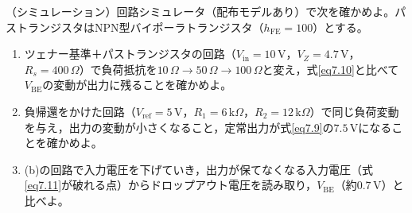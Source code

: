 \begin{章末問題}
\item \label{ex7.6}（シミュレーション）回路シミュレータ（配布モデルあり）で次を確かめよ。パストランジスタはNPN型バイポーラトランジスタ（$h_{\mathrm{FE}} = 100$）とする。
\begin{enumerate}
\item[(a)] ツェナー基準＋パストランジスタの回路（$V_{\mathrm{in}} = 10$\,V，$V_Z = 4.7$\,V，$R_s = 400\,\Omega$）で負荷抵抗を$10\,\Omega \to 50\,\Omega \to 100\,\Omega$と変え，式\ref{eq7.10}と比べて$V_{\mathrm{BE}}$の変動が出力に残ることを確かめよ。
\item[(b)] 負帰還をかけた回路（$V_{\mathrm{ref}} = 5$\,V，$R_1 = 6$\,k$\Omega$，$R_2 = 12$\,k$\Omega$）で同じ負荷変動を与え，出力の変動が小さくなること，定常出力が式\ref{eq7.9}の$7.5$\,Vになることを確かめよ。
\item[(c)] (b)の回路で入力電圧を下げていき，出力が保てなくなる入力電圧（式\ref{eq7.11}が破れる点）からドロップアウト電圧を読み取り，$V_{\mathrm{BE}}$（約$0.7$\,V）と比べよ。
\end{enumerate}
\end{章末問題}
